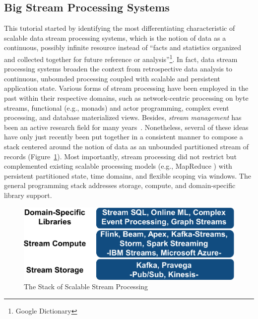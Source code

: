 
\subsection{Big Stream Processing Systems}
\label{sec:tut_systems}

This tutorial started by identifying the most differentiating characteristic of scalable data stream processing systems, which is the notion of data as a continuous, possibly infinite resource instead of ``facts and statistics organized and collected together for future reference or analysis''\footnote{Google Dictionary}. In fact, data stream processing systems broaden the context from retrospective data analysis to continuous, unbounded processing coupled with scalable and persistent application state.  Various forms of stream processing have been employed in the past within their respective domains, such as network-centric processing on byte streams, functional (e.g., monads) and actor programming, complex event processing, and database materialized views. Besides, \emph{stream management} has been an active research field for many years~\cite{abadi2003aurora,arasu_babu_widom_2006,chandrasekaran2003telegraphcq}. Nonetheless, several of these ideas have  only just recently been put together in a consistent manner to compose a stack  centered around the notion of data as an unbounded partitioned stream of records (Figure~\ref{fig:streamstack}). Most importantly, stream processing did not restrict but complemented existing scalable processing models (e.g., MapReduce \cite{dean2008mapreduce}) with persistent partitioned state, time domains, and flexible scoping via \mbox{windows}. The general programming stack  addresses storage, compute, and domain-specific library support.

\begin{figure}[t]
\centering
\includegraphics[width=0.4 \textwidth]{pictures/streamstack.pdf}
\vspace*{-2mm}
\caption{The Stack of Scalable Stream Processing}
\label{fig:streamstack}
\vspace*{-5mm}
\end{figure}

